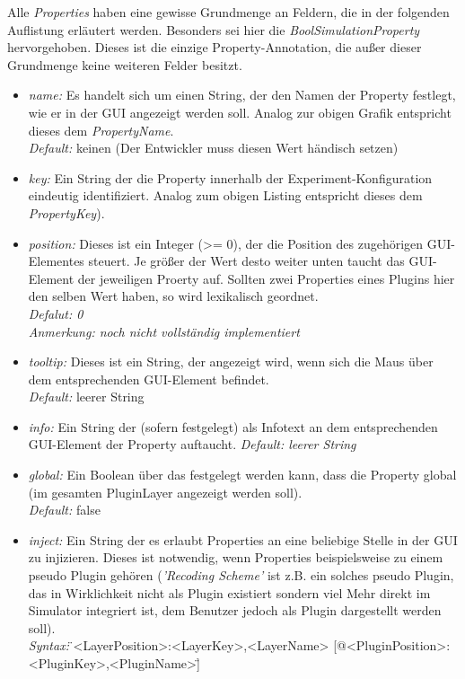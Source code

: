\documentclass[a4paper, 11pt]{article} %
\begin{document}
Alle \emph{Properties} haben eine gewisse Grundmenge an Feldern, die in der folgenden Auflistung erläutert werden. Besonders sei hier die \emph{BoolSimulationProperty} hervorgehoben. Dieses ist die einzige Property-Annotation, die außer dieser Grundmenge keine weiteren Felder besitzt.
\begin{itemize}
	\item \emph{name:} Es handelt sich um einen String, der den Namen der Property festlegt, wie er in der GUI angezeigt werden soll. Analog zur obigen Grafik entspricht dieses dem \emph{PropertyName}.\\
	\emph{Default:} keinen (Der Entwickler muss diesen Wert händisch setzen)
	\item \emph{key:} Ein String der die Property innerhalb der Experiment-Konfiguration eindeutig identifiziert. Analog zum obigen Listing entspricht dieses dem \emph{PropertyKey}).
	\item \emph{position:} Dieses ist ein Integer (>= 0), der die Position des zugehörigen GUI-Elementes steuert. Je größer der Wert desto weiter unten taucht das GUI-Element der jeweiligen Proerty auf. Sollten zwei Properties eines Plugins hier den selben Wert haben, so wird lexikalisch geordnet.\\
	\emph{Defalut: 0}\\
	\emph{Anmerkung: noch nicht vollständig implementiert}
	\item \emph{tooltip:} Dieses ist ein String, der angezeigt wird, wenn sich die Maus über dem entsprechenden GUI-Element befindet.\\
	\emph{Default:} leerer String 
	\item \emph{info:} Ein String der (sofern festgelegt) als Infotext an dem entsprechenden GUI-Element der Property auftaucht.  
	\emph{Default: leerer String}
	\item \emph{global:} Ein Boolean über das festgelegt werden kann, dass die Property global (im gesamten PluginLayer angezeigt werden soll).\\
	\emph{Default:} false
	\item \emph{inject:} Ein String der es erlaubt Properties an eine beliebige Stelle in der GUI zu injizieren. Dieses ist notwendig, wenn Properties beispielsweise zu einem pseudo Plugin gehören (\emph{'Recoding Scheme'} ist z.B. ein solches pseudo Plugin, das in Wirklichkeit nicht als Plugin existiert sondern viel Mehr direkt im Simulator integriert ist, dem Benutzer jedoch als Plugin dargestellt werden soll). \\
	\emph{Syntax:} \"{}<LayerPosition>:<LayerKey>,<LayerName> [@<PluginPosition>:<PluginKey>,<PluginName>]\"{}\\

\end{itemize}
\end{document}
